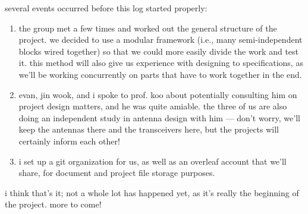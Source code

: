 several events occurred before this log started properly:
\begin{enumerate}
	\item the group met a few times and worked out the general structure of
	the project. we decided to use a modular framework (i.e., many
	semi-independent blocks wired together) so that we could more easily
	divide the work and test it. this method will also give us experience
	with designing to specifications, as we'll be working concurrently on
	parts that have to work together in the end.

	\item evan, jin wook, and i spoke to prof. koo about potentially
	consulting him on project design matters, and he was quite amiable. the
	three of us are also doing an independent study in antenna design with
	him --- don't worry, we'll keep the antennas there and the transceivers
	here, but the projects will certainly inform each other!

	\item i set up a git organization for us, as well as an overleaf
	account that we'll share, for document and project file storage
	purposes.
\end{enumerate}
i think that's it; not a whole lot has happened yet, as it's really the
beginning of the project. more to come!
